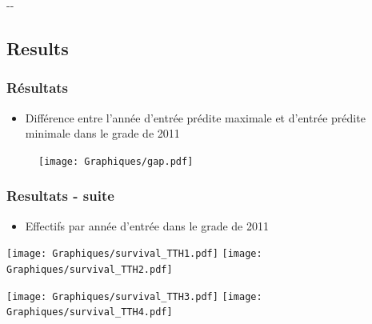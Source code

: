 \documentclass[xcolor=table,ignorenonframetext,12pt]{beamer}
\newlength{\offsetpage}
\newenvironment{widepage}{\begin{adjustwidth}{-\offsetpage}{-\offsetpage}%
		\addtolength{\textwidth}{2\offsetpage}}%
	{\end{adjustwidth}}
\begin{document}
\begin{frame}
\begin{widepage}
\begin{center}
{
}

\end{center}

\end{widepage}
\begin{flushright}
	\hyperlink{chevauchements}{}
\end{flushright}

\end{frame}

\subsection{Results}
\begin{frame}
\frametitle{Résultats}
\begin{itemize}
\item Différence entre l'année d'entrée prédite maximale et d'entrée prédite minimale dans le grade de 2011
\end{itemize}
\begin{figure}
\vspace{-0.5cm}
\texttt{[image: Graphiques/gap.pdf]}
\end{figure}

\end{frame}

\begin{frame}
\frametitle{Resultats - suite}
\begin{itemize}
	\item Effectifs par année d'entrée dans le grade de 2011
\end{itemize}
\begin{center}
	\texttt{[image: Graphiques/survival\_TTH1.pdf]}
	\texttt{[image: Graphiques/survival\_TTH2.pdf]}
\end{center}
\begin{center}
	\texttt{[image: Graphiques/survival\_TTH3.pdf]}
	\texttt{[image: Graphiques/survival\_TTH4.pdf]}
\end{center}

\end{frame}
\end{document}
